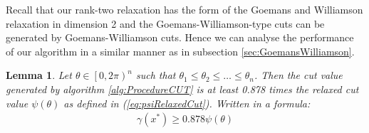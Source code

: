 \documentclass[12pt,a4paper]{article}
\theoremstyle{mythm}
\newtheorem{lem}[thm]{Lemma}
\begin{document}
Recall that our rank-two relaxation has the form of the Goemans and Williamson relaxation in dimension 2 and the Goemans-Williamson-type cuts can be generated by Goemans-Williamson
cuts.
Hence we can analyse the performance of our algorithm in a similar manner as in subsection \ref{sec:GoemansWilliamson}.
\begin{lem}
Let $ \theta \in \left[ 0 , 2 \pi  \right) ^{ n }  $ such that $ \theta_1 \leq \theta_2 \leq \dots \leq \theta_n    $. Then the cut value generated by algorithm \ref{alg:ProcedureCUT} is at least 0.878 times the relaxed cut value $ \psi (\theta) $ as defined in
(\ref{eq:psiRelaxedCut}). 
Written in a formula:
\begin{align}
\label{eq:perfguarantee} 
\gamma (x^*) \geq 0.878 \psi (\theta) 
\end{align} 
\end{lem} 
\end{document}
